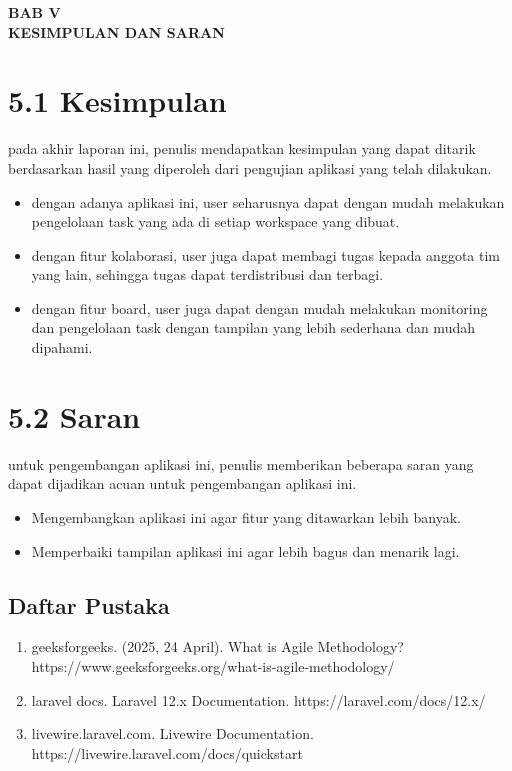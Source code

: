 \begin{center}
  \textbf{BAB V} \\[0.5em]
  \textbf{KESIMPULAN DAN SARAN}
\end{center}

\section*{5.1 Kesimpulan}
pada akhir laporan ini, penulis mendapatkan kesimpulan yang dapat ditarik berdasarkan hasil yang diperoleh dari pengujian aplikasi yang telah dilakukan.
\begin{itemize}
  \item dengan adanya aplikasi ini, user seharusnya dapat dengan mudah melakukan pengelolaan task yang ada di setiap workspace yang dibuat.
  \item dengan fitur kolaborasi, user juga dapat membagi tugas kepada anggota tim yang lain, sehingga tugas dapat terdistribusi dan terbagi.
  \item dengan fitur board, user juga dapat dengan mudah melakukan monitoring dan pengelolaan task dengan tampilan yang lebih sederhana dan mudah dipahami.
\end{itemize}



\section*{5.2 Saran}
untuk pengembangan aplikasi ini, penulis memberikan beberapa saran yang dapat dijadikan acuan untuk pengembangan aplikasi ini.
\begin{itemize}
  \item Mengembangkan aplikasi ini agar fitur yang ditawarkan lebih banyak.
  \item Memperbaiki tampilan aplikasi ini agar lebih bagus dan menarik lagi.
\end{itemize}



\pagebreak
\begin{center}
\section*{Daftar Pustaka}
\begin{enumerate}
  \item geeksforgeeks. (2025, 24 April). What is Agile Methodology? https://www.geeksforgeeks.org/what-is-agile-methodology/ 
  \item laravel docs. Laravel 12.x Documentation. https://laravel.com/docs/12.x/
  \item livewire.laravel.com. Livewire Documentation. https://livewire.laravel.com/docs/quickstart
\end{enumerate}
\end{center}

